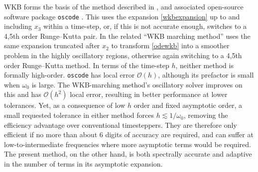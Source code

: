 \documentclass[10pt]{article}
\newcommand{\bigO}{{\mathcal O}}
\newcommand{\om}{\omega}
\newcommand{\g}{\gamma}
\newcommand{\AB}[1]{{\color{orange}#1}}
\begin{document}
WKB forms the basis of the method described in
\cite{agocs2020efficient,agocs2020dense}, and associated open-source software
package \texttt{oscode} \cite{agocs2020joss}. This uses the expansion
\cref{wkbexpansion} up to and including $x_3$ within a time-step,
or, if this is not accurate enough, switches to a 4,5th
order Runge--Kutta pair.
In \cite{arnold2011wkb,korner2022wkb} the related
``WKB marching method'' uses the same
expansion truncated after $x_2$ to transform \cref{odewkb} into a smoother
problem in the highly oscillatory regions,
otherwise again switching to a 4,5th order Runge--Kutta method.
%
In terms of the time-step $h$, neither method is formally high-order.
\texttt{oscode} has
local error $\bigO(h)$, although
its prefactor is small when $\om_0$ is large.
The
WKB-marching method's oscillatory solver improves on this and has $\bigO(h^2)$ local error, resulting in better performance at lower tolerances.
Yet, as a consequence of low $h$ order and fixed asymptotic order,
a small requested tolerance in either method forces
$h \lesssim 1/\om_0$, removing the efficiency advantage over conventional timesteppers.
They are therefore only efficient if no more than about 6 digits of accuracy
are required, and can suffer at low-to-intermediate frequencies where more asymptotic terms would be required.
The present method, on the other hand, is both spectrally accurate and 
adaptive in the number of terms in its asymptotic expansion.

\end{document}
